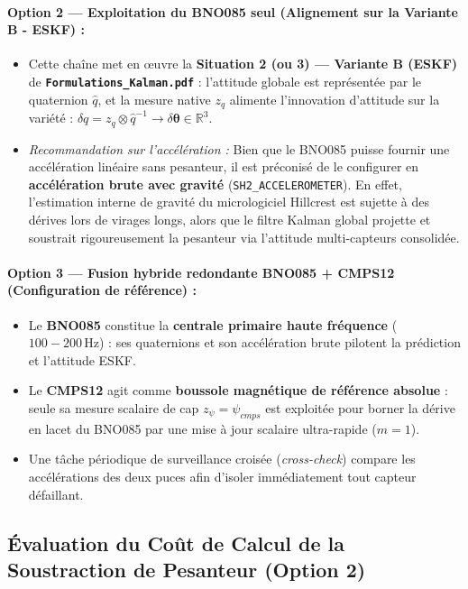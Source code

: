 \documentclass[../Implementation.tex]{subfiles}
\begin{document}
\paragraph{Option 2 — Exploitation du BNO085 seul (Alignement sur la Variante B - ESKF) :}
\begin{itemize}
    \item Cette chaîne met en œuvre la \textbf{Situation 2 (ou 3) — Variante B (ESKF)} de \textbf{\texttt{Formulations\_Kalman.pdf}} : l'attitude globale est représentée par le quaternion $\hat{q}$, et la mesure native $z_q$ alimente l'innovation d'attitude sur la variété : $\delta q = z_q \otimes \hat{q}^{-1} \to \delta\boldsymbol{\theta} \in \mathbb{R}^3$.
    \item \textit{Recommandation sur l'accélération :} Bien que le BNO085 puisse fournir une accélération linéaire sans pesanteur, il est préconisé de le configurer en \textbf{accélération brute avec gravité} (\lstinline|SH2_ACCELEROMETER|). En effet, l'estimation interne de gravité du micrologiciel Hillcrest est sujette à des dérives lors de virages longs, alors que le filtre Kalman global projette et soustrait rigoureusement la pesanteur via l'attitude multi-capteurs consolidée.
\end{itemize}

\paragraph{Option 3 — Fusion hybride redondante BNO085 + CMPS12 (Configuration de référence) :}
\begin{itemize}
    \item Le \textbf{BNO085} constitue la \textbf{centrale primaire haute fréquence} ($100 - 200\,\text{Hz}$) : ses quaternions et son accélération brute pilotent la prédiction et l'attitude ESKF.
    \item Le \textbf{CMPS12} agit comme \textbf{boussole magnétique de référence absolue} : seule sa mesure scalaire de cap $z_\psi = \psi_{cmps}$ est exploitée pour borner la dérive en lacet du BNO085 par une mise à jour scalaire ultra-rapide ($m=1$).
    \item Une tâche périodique de surveillance croisée (\textit{cross-check}) compare les accélérations des deux puces afin d'isoler immédiatement tout capteur défaillant.
\end{itemize}

\subsection{Évaluation du Coût de Calcul de la Soustraction de Pesanteur (Option 2)}
\end{document}
